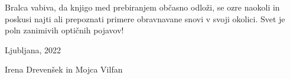 \documentclass[11pt,fleqn]{book} %
\begin{document}
Bralca vabiva, da knjigo med prebiranjem občasno odloži, se ozre
naokoli in poskusi najti ali prepoznati primere obravnavane snovi
v svoji okolici. Svet je poln zanimivih optičnih pojavov!


\vspace{1em}

Ljubljana, 2022

\hfill Irena Drevenšek in Mojca Vilfan

\cleardoublepage
\thispagestyle{empty}
\mbox{}
\cleardoublepage













%
%
%
\printindex
\end{document}
